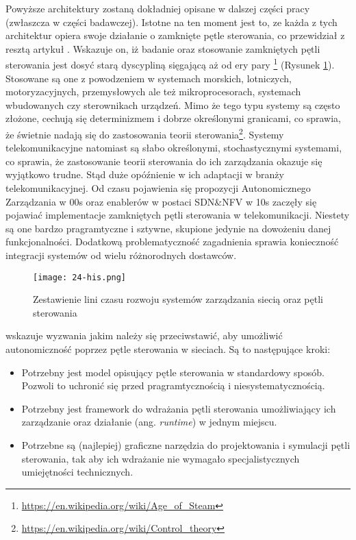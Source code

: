 Powyższe architektury zostaną dokładniej opisane w dalszej części pracy (zwłaszcza w części badawczej). Istotne na ten moment jest to, ze każda z tych architektur opiera swoje działanie o zamknięte pętle sterowania, co przewidział z resztą artykuł \cite{fallon2019}. Wskazuje on, iż badanie oraz stosowanie zamkniętych pętli sterowania jest dosyć starą dyscypliną sięgającą aż od ery pary \footnote{\url{https://en.wikipedia.org/wiki/Age_of_Steam}} (Rysunek \ref{fig:24-his}). Stosowane są one z powodzeniem w systemach morskich, lotniczych, motoryzacyjnych, przemysłowych ale też mikroprocesorach, systemach wbudowanych czy sterownikach urządzeń. Mimo że tego typu systemy są często złożone, cechują się determinizmem i dobrze określonymi granicami, co sprawia, że świetnie nadają się do zastosowania teorii sterowania\footnote{\url{https://en.wikipedia.org/wiki/Control_theory}}. Systemy telekomunikacyjne natomiast są słabo określonymi, stochastycznymi systemami, co sprawia, że zastosowanie teorii sterowania do ich zarządzania okazuje się wyjątkowo trudne. Stąd duże opóźnienie w ich adaptacji w branży telekomunikacyjnej. Od czasu pojawienia się propozycji Autonomicznego Zarządzania \cite{kephart2003} w 00s oraz enablerów w postaci SDN\&NFV w 10s zaczęły się pojawiać implementacje zamkniętych pętli sterowania w telekomunikacji. Niestety są one bardzo pragramtyczne i sztywne, skupione jedynie na dowożeniu danej funkcjonalności. Dodatkową problematyczność zagadnienia sprawia konieczność integracji systemów od wielu różnorodnych dostawców.

\begin{figure}[!htbp]
    \centering \texttt{[image: 24-his.png]}
    \caption{Zestawienie lini czasu rozwoju systemów zarządzania siecią oraz pętli sterowania}\label{fig:24-his}
\end{figure}

\cite{fallon2019} wskazuje wyzwania jakim należy się przeciwstawić, aby umożliwić autonomiczność poprzez pętle sterowania w sieciach. Są to następujące kroki:
\begin{itemize}
    \item Potrzebny jest model opisujący pętle sterowania w standardowy sposób. Pozwoli to uchronić się przed pragramtycznością i niesystematycznością.
    \item Potrzebny jest framework do wdrażania pętli sterowania umożliwiający ich zarządzanie oraz działanie (ang. \textit{runtime}) w jednym miejscu.
    \item Potrzebne są (najlepiej) graficzne narzędzia do projektowania i symulacji pętli sterowania, tak aby ich wdrażanie nie wymagało specjalistycznych umiejętności technicznych.
\end{itemize}

